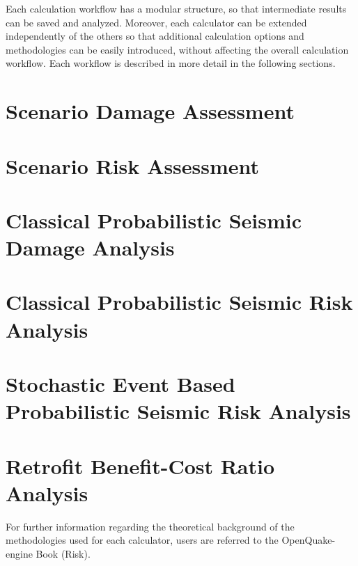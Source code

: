 Each calculation workflow has a modular structure, so that intermediate
results can be saved and analyzed. Moreover, each calculator can be
extended independently of the others so that additional calculation options
and methodologies can be easily introduced, without affecting the overall
calculation workflow. Each workflow is described in more detail in the
following sections.

\section{Scenario Damage Assessment}
\label{sec:workflow_scenario_damage}


\section{Scenario Risk Assessment}
\label{sec:workflow_scenario_risk}


\section{Classical Probabilistic Seismic Damage Analysis}
\label{sec:workflow_classical_damage}


\section{Classical Probabilistic Seismic Risk Analysis}
\label{sec:workflow_classical_risk}


\section{Stochastic Event Based Probabilistic Seismic Risk Analysis}
\label{sec:workflow_event_based_risk}


\section{Retrofit Benefit-Cost Ratio Analysis}
\label{sec:workflow_benefit_cost}


For further information regarding the theoretical background of the
methodologies used for each calculator, users are referred to the OpenQuake-
engine Book (Risk).

\cleardoublepage
